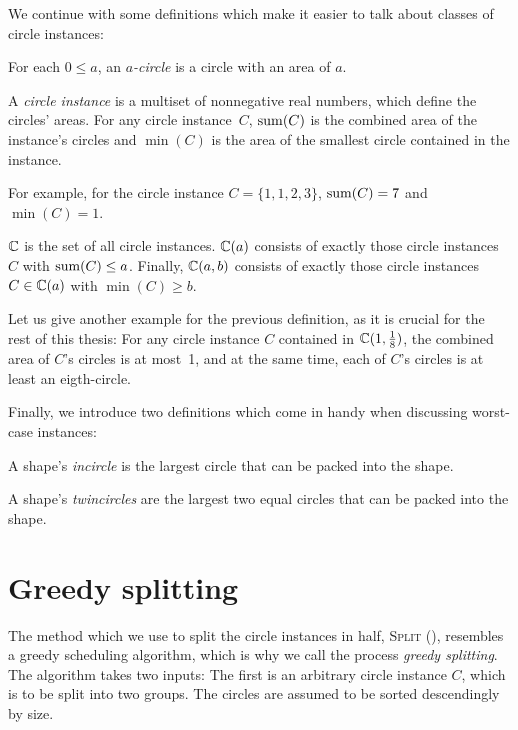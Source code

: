 \documentclass[a4paper,style=print,bibliography=totoc,nexus,lnum,extramargin]{tubsbook}
\begin{document}
We continue with some definitions which make it easier to talk about classes of circle instances:

\begin{definition}
    For each $0 \le a$, an \emph{$a$-circle} is a circle with an area of $a$.
\end{definition}

\begin{definition}\label{def:circle-instance}
    A \emph{circle instance} is a multiset of nonnegative real numbers, which define the circles' areas.
    For any circle instance~$C$, $\operatorname{sum}(C)$ is the combined area of the instance's circles and $\min(C)$ is the area of the smallest circle contained in the instance.
\end{definition}

For example, for the circle instance $C = \{1,1,2,3\}$, $\operatorname{sum}(C) = 7$ and $\min(C) = 1$.

\begin{definition}
    $\mathbb{C}$ is the set of all circle instances. $\mathbb{C}(a)$ consists of exactly those circle instances $C$ with $\operatorname{sum}(C) \le a$. Finally, $\mathbb{C}(a,b)$ consists of exactly those circle instances $C \in \mathbb{C}(a)$ with $\min(C) \ge b$.
\end{definition}

Let us give another example for the previous definition, as it is crucial for the rest of this thesis: For any circle instance $C$ contained in $\mathbb{C}(1,\frac{1}{8})$, the combined area of $C$'s circles is at most~1, and at the same time, each of $C$'s circles is at least an eigth-circle.

Finally, we introduce two definitions which come in handy when discussing worst-case instances:

\begin{definition}
    A shape's \emph{incircle} is the largest circle that can be packed into the shape.
\end{definition}

\begin{definition}
    A shape's \emph{twincircles} are the largest two equal circles that can be packed into the shape.
\end{definition}

\section{Greedy splitting}

The method which we use to split the circle instances in half, \textsc{Split} (), resembles a greedy scheduling algorithm, which is why we call the process \emph{greedy splitting}. The algorithm takes two inputs: The first is an arbitrary circle instance $C$, which is to be split into two groups. The circles are assumed to be sorted descendingly by size.
\end{document}
